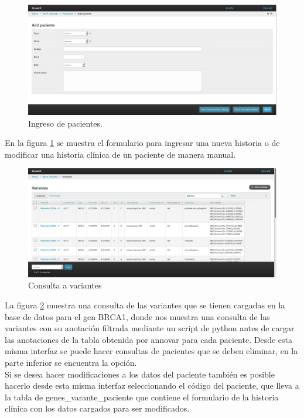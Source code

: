 \begin{figure}[h] 
	\centering
	\includegraphics[width=1\textwidth]{Kap3/ingresar_paciente}
	\caption{Ingreso de pacientes.} \label{fig:pacientes}
\end{figure}

En la figura \ref{fig:pacientes} se muestra el formulario para ingresar una nueva historia o de modificar una historia clínica de un paciente de manera manual.\\

\begin{figure}[h] 
	\centering
	\includegraphics[width=1\textwidth]{Kap3/consulta}
	\caption{Consulta a variantes} \label{fig:consulta}
\end{figure}


La figura \ref{fig:consulta} muestra una consulta de las variantes que se tienen cargadas en la base de datos para el gen BRCA1, donde nos muestra una consulta de las variantes con su anotación  filtrada mediante un script de python antes de cargar las anotaciones de la tabla obtenida por annovar para cada paciente. Desde esta misma interfaz se puede hacer consultas de pacientes que se deben eliminar, en la parte inferior se encuentra la opción.\\

Si se desea hacer modificaciones a los datos del paciente también es posible hacerlo desde esta misma interfaz seleccionando el código del paciente, que lleva a la tabla de genes\_varante\_paciente que contiene el formulario de la historia clínica con los datos cargados para ser modificados. 

